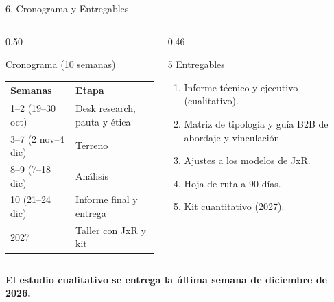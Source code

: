 \documentclass[aspectratio=169, 10pt]{beamer}
\begin{document}
\begin{frame}{6. Cronograma y Entregables}
  \begin{columns}[T]
    \begin{column}{0.50\textwidth}
      \begin{block}{Cronograma (10 semanas)}
        \footnotesize
        \begin{tabular}{l l}
          \toprule
          \textbf{Semanas} & \textbf{Etapa} \\
          \midrule
          1--2 (19--30 oct) & Desk research, pauta y ética \\
          3--7 (2 nov--4 dic) & Terreno \\
          8--9 (7--18 dic) & Análisis \\
          10 (21--24 dic) & Informe final y entrega \\
          2027 & Taller con JxR y kit \\
          \bottomrule
        \end{tabular}
      \end{block}
    \end{column}
    \begin{column}{0.46\textwidth}
      \begin{block}{5 Entregables}
        \small
        \begin{enumerate}
          \item Informe técnico y ejecutivo (cualitativo).
          \item Matriz de tipología y guía B2B de abordaje y vinculación.
          \item Ajustes a los modelos de JxR.
          \item Hoja de ruta a 90 días.
          \item Kit cuantitativo (2027).
        \end{enumerate}
      \end{block}
    \end{column}
  \end{columns}
  \vspace{0.1cm}
  \begin{center}
    \small \textbf{El estudio cualitativo se entrega la última semana de diciembre de 2026.}
  \end{center}
\end{frame}
\end{document}
